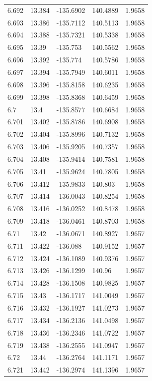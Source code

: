 \begin{tabular}{lllll}
6.692 & 13.384 & -135.6902 & 140.4889 & 1.9658 \\
6.693 & 13.386 & -135.7112 & 140.5113 & 1.9658 \\
6.694 & 13.388 & -135.7321 & 140.5338 & 1.9658 \\
6.695 & 13.39 & -135.753 & 140.5562 & 1.9658 \\
6.696 & 13.392 & -135.774 & 140.5786 & 1.9658 \\
6.697 & 13.394 & -135.7949 & 140.6011 & 1.9658 \\
6.698 & 13.396 & -135.8158 & 140.6235 & 1.9658 \\
6.699 & 13.398 & -135.8368 & 140.6459 & 1.9658 \\
6.7 & 13.4 & -135.8577 & 140.6684 & 1.9658 \\
6.701 & 13.402 & -135.8786 & 140.6908 & 1.9658 \\
6.702 & 13.404 & -135.8996 & 140.7132 & 1.9658 \\
6.703 & 13.406 & -135.9205 & 140.7357 & 1.9658 \\
6.704 & 13.408 & -135.9414 & 140.7581 & 1.9658 \\
6.705 & 13.41 & -135.9624 & 140.7805 & 1.9658 \\
6.706 & 13.412 & -135.9833 & 140.803 & 1.9658 \\
6.707 & 13.414 & -136.0043 & 140.8254 & 1.9658 \\
6.708 & 13.416 & -136.0252 & 140.8478 & 1.9658 \\
6.709 & 13.418 & -136.0461 & 140.8703 & 1.9658 \\
6.71 & 13.42 & -136.0671 & 140.8927 & 1.9657 \\
6.711 & 13.422 & -136.088 & 140.9152 & 1.9657 \\
6.712 & 13.424 & -136.1089 & 140.9376 & 1.9657 \\
6.713 & 13.426 & -136.1299 & 140.96 & 1.9657 \\
6.714 & 13.428 & -136.1508 & 140.9825 & 1.9657 \\
6.715 & 13.43 & -136.1717 & 141.0049 & 1.9657 \\
6.716 & 13.432 & -136.1927 & 141.0273 & 1.9657 \\
6.717 & 13.434 & -136.2136 & 141.0498 & 1.9657 \\
6.718 & 13.436 & -136.2346 & 141.0722 & 1.9657 \\
6.719 & 13.438 & -136.2555 & 141.0947 & 1.9657 \\
6.72 & 13.44 & -136.2764 & 141.1171 & 1.9657 \\
6.721 & 13.442 & -136.2974 & 141.1396 & 1.9657 \\

\end{tabular}
